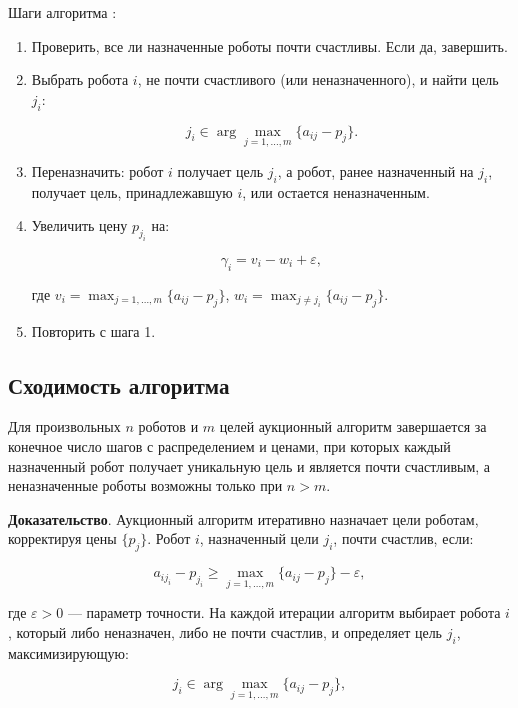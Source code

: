 Шаги алгоритма \cite{bertsekas1990}:

\begin{enumerate}
    \item Проверить, все ли назначенные роботы почти счастливы. Если да, завершить.
    \item Выбрать робота \( i \), не почти счастливого (или неназначенного), и найти цель \( j_i \):

    \[
    j_i \in \arg \max_{j=1,\ldots,m} \{a_{ij} - p_j\}.
    \]

    \item Переназначить: робот \( i \) получает цель \( j_i \), а робот, ранее назначенный на \( j_i \), получает цель, принадлежавшую \( i \), или остается неназначенным.
    \item Увеличить цену \( p_{j_i} \) на:

    \[
    \gamma_i = v_i - w_i + \varepsilon,
    \]

    где \( v_i = \max_{j=1,\ldots,m} \{a_{ij} - p_j\} \), \( w_i = \max_{j \neq j_i} \{a_{ij} - p_j\} \).
    \item Повторить с шага 1.
\end{enumerate}

\subsection{Сходимость алгоритма}
\begin{theorem}
\label{thm:auction_convergence}
Для произвольных \( n \) роботов и \( m \) целей аукционный алгоритм завершается за конечное число шагов с распределением и ценами, при которых каждый назначенный робот получает уникальную цель и является почти счастливым, а неназначенные роботы возможны только при \( n > m \).
\end{theorem}

\textbf{Доказательство}. Аукционный алгоритм итеративно назначает цели роботам, корректируя цены \( \{p_j\} \). Робот \( i \), назначенный цели \( j_i \), почти счастлив, если:

\[
a_{i j_i} - p_{j_i} \geq \max_{j=1,\ldots,m} \{a_{ij} - p_j\} - \varepsilon,
\]

\noindent где \( \varepsilon > 0 \) — параметр точности. На каждой итерации алгоритм выбирает робота \( i \), который либо неназначен, либо не почти счастлив, и определяет цель \( j_i \), максимизирующую:

\[
j_i \in \arg \max_{j=1,\ldots,m} \{a_{ij} - p_j\},
\]

